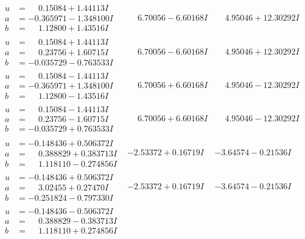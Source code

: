 \documentclass[1p]{elsarticle_modified}
\theoremstyle{definition}
\begin{document}
$$\begin{array}{c|c|c}
\begin{aligned}
u &= \phantom{-}0.15084 + 1.44113 I \\
a &= -0.365971 - 1.348100 I \\
b &= \phantom{-}1.12800 + 1.43516 I\end{aligned}
 & \phantom{-}6.70056 - 6.60168 I & \phantom{-}4.95046 + 12.30292 I \\ \hline\begin{aligned}
u &= \phantom{-}0.15084 + 1.44113 I \\
a &= \phantom{-}0.23756 + 1.60715 I \\
b &= -0.035729 - 0.763533 I\end{aligned}
 & \phantom{-}6.70056 - 6.60168 I & \phantom{-}4.95046 + 12.30292 I \\ \hline\begin{aligned}
u &= \phantom{-}0.15084 - 1.44113 I \\
a &= -0.365971 + 1.348100 I \\
b &= \phantom{-}1.12800 - 1.43516 I\end{aligned}
 & \phantom{-}6.70056 + 6.60168 I & \phantom{-}4.95046 - 12.30292 I \\ \hline\begin{aligned}
u &= \phantom{-}0.15084 - 1.44113 I \\
a &= \phantom{-}0.23756 - 1.60715 I \\
b &= -0.035729 + 0.763533 I\end{aligned}
 & \phantom{-}6.70056 + 6.60168 I & \phantom{-}4.95046 - 12.30292 I \\ \hline\begin{aligned}
u &= -0.148436 + 0.506372 I \\
a &= \phantom{-}0.388829 + 0.383713 I \\
b &= \phantom{-}1.118110 - 0.274856 I\end{aligned}
 & -2.53372 + 0.16719 I & -3.64574 - 0.21536 I \\ \hline\begin{aligned}
u &= -0.148436 + 0.506372 I \\
a &= \phantom{-}3.02455 + 0.27470 I \\
b &= -0.251824 - 0.797330 I\end{aligned}
 & -2.53372 + 0.16719 I & -3.64574 - 0.21536 I \\ \hline\begin{aligned}
u &= -0.148436 - 0.506372 I \\
a &= \phantom{-}0.388829 - 0.383713 I \\
b &= \phantom{-}1.118110 + 0.274856 I\end{aligned}

\end{array}$$
\end{document}
